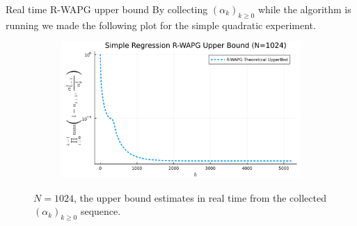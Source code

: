 \documentclass[11pt]{beamer}
\theoremstyle{definition}
\begin{document}
        \begin{frame}{Real time R-WAPG upper bound}
            By collecting $(\alpha_k)_{k \ge 0}$ while the algorithm is running we made the following plot for the simple quadratic experiment. 
            \begin{figure}[H]
                \centering
                \begin{subfigure}[b]{0.75\textwidth}
                    \centering
                    \includegraphics[width=\textwidth]{
                        assets/simple_regression_rwapg_upperbnd_1024.png
                    }
                \end{subfigure}
                \caption{
                    $N = 1024$, the upper bound estimates in real time from the collected $(\alpha_k)_{k \ge 0}$ sequence. 
                }
                \label{fig:simple-quadratic-r-wapg-rwapg-upperbnd}
            \end{figure}
        \end{frame} 
\end{document}
